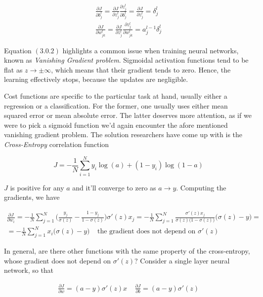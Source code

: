 \documentclass{article}
\numberwithin{equation}{subsection}
\begin{document}
\begin{gather}
    \frac{\partial J}{\partial b_j^l} = \frac{\partial J}{\partial z_j^l} \frac{\partial z_j^l}{\partial b_j^l} = \frac{\partial J}{\partial z_j^l} = \delta_j^l \\
    \frac{\partial J}{\partial w^l_{jk}} = \frac{\partial J}{\partial z_j^l}\frac{\partial z^l_j}{\partial w^l_{jk}} = a^{l-1}_j \delta_j^l
\end{gather}

Equation $(3.0.2)$ highlights a common issue when training neural networks, known as \textit{Vanishing Gradient problem}. Sigmoidal activation functions tend to be flat as $z \to \pm \infty$, which means that their gradient tends to zero. Hence, the learning effectively stops, because the updates are negligible.

Cost functions are specific to the particular task at hand, usually either a regression or a classification. For the former, one usually uses either mean squared error or mean absolute error. The latter deserves more attention, as if we were to pick a sigmoid function we'd again encounter the afore mentioned vanishing gradient problem. The solution researchers have come up with is the \textit{Cross-Entropy} correlation function

\begin{equation}
    J = -\frac{1}{N} \sum_{i=1}^N y_i \log(a) + (1-y_i) \log(1-a)
\end{equation}

$J$ is positive for any $a$ and it'll converge to zero as $a \to y$. Computing the gradients, we have

\begin{gather*}
    \frac{\partial J}{\partial w_i} = -\frac{1}{N} \sum_{j=1}^N \Big( \frac{y_j}{\sigma(z)}  - \frac{1-y_j}{1-\sigma(z)}\Big) \sigma'(z) x_j = -\frac{1}{N} \sum_{j=1}^N \frac{\sigma'(z) x_j}{\sigma(z) \big(1-\sigma(z)\big)} \big( \sigma(z) - y \big) = \\
    = -\frac{1}{N} \sum_{j=1}^N x_i \big( \sigma(z) - y \big) \;\;\;\; \text{the gradient does not depend on $\sigma'(z)$}
\end{gather*}

In general, are there other functions with the same property of the cross-entropy, whose gradient does not depend on $\sigma'(z)$? Consider a single layer neural network, so that

\begin{gather*}
    \frac{\partial J}{\partial w} = (a-y) \sigma'(z) x \;\;\;\; \frac{\partial J}{\partial b} = (a-y) \sigma'(z)
\end{gather*}
\end{document}
